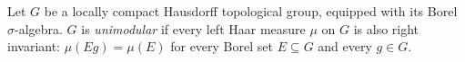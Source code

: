 Let $G$ be a locally compact Hausdorff topological group, equipped with its Borel $\sigma$-algebra. $G$ is
\emph{unimodular} if every left Haar measure $\mu$ on $G$ is also right invariant: $\mu(Eg)=\mu(E)$ for every Borel set
$E\subseteq G$ and every $g\in G$.

